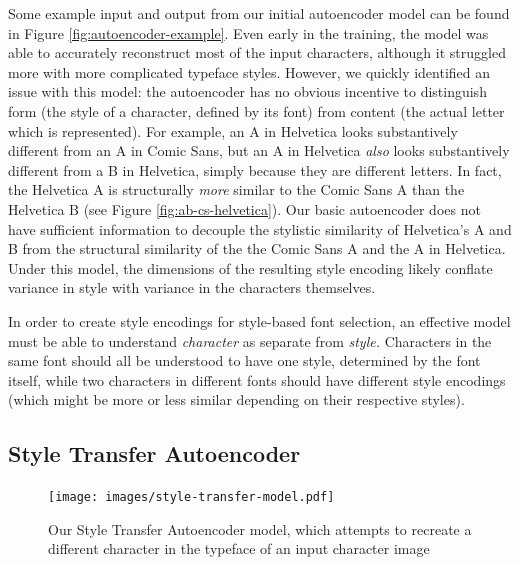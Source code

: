 Some example input and output from our initial autoencoder model can be found in Figure \ref{fig:autoencoder-example}. Even early in the training, the model was able to accurately reconstruct most of the input characters, although it struggled more with more complicated typeface styles. However, we quickly identified an issue with this model: the autoencoder has no obvious incentive to distinguish form (the style of a character, defined by its font) from content (the actual letter which is represented). For example, an { A} in Helvetica looks substantively different from an { A} in Comic Sans, but an { A} in Helvetica \textit{also} looks substantively different from a { B} in Helvetica, simply because they are different letters. In fact, the Helvetica { A} is structurally \emph{more} similar to the Comic Sans { A} than the Helvetica { B} (see Figure \ref{fig:ab-cs-helvetica}). Our basic autoencoder does not have sufficient information to decouple the stylistic similarity of Helvetica's { A} and { B} from the structural similarity of the the Comic Sans { A} and the { A} in Helvetica. Under this model, the dimensions of the resulting style encoding likely conflate variance in style with variance in the characters themselves.

In order to create style encodings for style-based font selection, an effective model must be able to understand \emph{character} as separate from \emph{style.} Characters in the same font should all be understood to have one style, determined by the font itself, while two characters in different fonts should have different style encodings (which might be more or less similar depending on their respective styles).

\subsection{Style Transfer Autoencoder} \label{style-transfer}

\begin{figure}[]
    \centering
    \texttt{[image: images/style-transfer-model.pdf]}
    \caption{Our Style Transfer Autoencoder model, which attempts to recreate a different character in the typeface of an input character image}
    \label{fig:style-transfer-model}
\end{figure}

